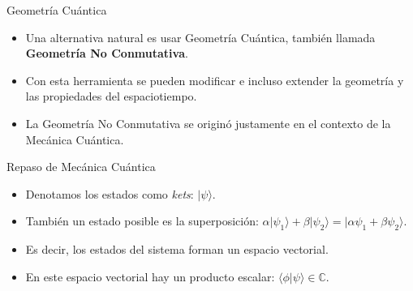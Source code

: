 \documentclass{beamer}
\begin{document}
\begin{frame}{Geometría Cuántica}
\begin{itemize}
\item Una alternativa natural es usar Geometría Cuántica, también llamada {\bf{Geometría No Conmutativa}}. 
\vspace{5mm}
\item Con esta herramienta se pueden modificar e incluso extender la geometría y las propiedades del espaciotiempo.
\vspace{5mm}
 \item La Geometría No Conmutativa se originó justamente en el contexto de  la Mecánica Cuántica. 
 
 \end{itemize}
\end{frame}


\begin{frame}{Repaso de Mecánica Cuántica}
\begin{itemize}


\item Denotamos los estados como \textit{kets}: $\lvert \psi \rangle$.
\vspace{5mm}

\item También un estado posible es la superposición: $\alpha \lvert \psi_1 \rangle + \beta \lvert \psi_2 \rangle = \lvert \alpha \psi_1 + \beta \psi_2 \rangle$.
\vspace{5mm}

 \item Es decir, los estados del sistema forman un espacio vectorial. 
\vspace{5mm}
\item  En este espacio vectorial hay un producto escalar: $\langle \phi \lvert \psi \rangle \in \mathbb{C}$.

\end{itemize}
\end{frame}
\end{document}
